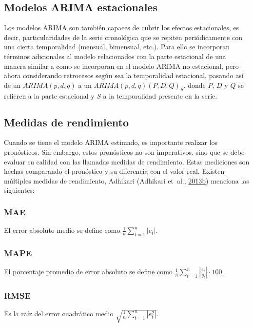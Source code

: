 \documentclass[]{article}
\begin{document}
\subsection{Modelos ARIMA estacionales}

Los modelos ARIMA son también capaces de cubrir los efectos
estacionales, es decir, particularidades de la serie cronológica que se
repiten periódicamente con una cierta temporalidad (mensual, bimensual,
etc.). Para ello se incorporan términos adicionales al modelo
relacionados con la parte estacional de una manera similar a como se
incorporan en el modelo ARIMA no estacional, pero ahora considerando
retrocesos según sea la temporalidad estacional, pasando así de un
\(ARIMA(p,d,q)\) a un \(ARIMA(p,d,q)(P,D,Q)_S\), donde \(P\), \(D\) y
\(Q\) se refieren a la parte estacional y \(S\) a la temporalidad
presente en la serie.

\subsection{Medidas de rendimiento}

Cuando se tiene el modelo ARIMA estimado, es importante realizar los
pronósticos. Sin embargo, estos pronósticos no son imperativos, sino que
se debe evaluar su calidad con las llamadas medidas de rendimiento.
Estas mediciones son hechas comparando el pronóstico y su diferencia con
el valor real. Existen múltiples medidas de rendimiento, Adhikari
(Adhikari et~al.,
\protect\hyperlink{ref-medidas}{2013}\protect\hyperlink{ref-medidas}{b})
menciona las siguientes:

\subsubsection{MAE}

El error absoluto medio se define como
\(\frac{1}{n}\sum_{t=1}^n |e_t|\).

\subsubsection{MAPE}

El porcentaje promedio de error absoluto se define como
\(\frac{1}{n}\sum_{t=1}^n \left|\frac{e_t}{y_t}\right|\cdot 100\).

\subsubsection{RMSE}

Es la raíz del error cuadrático medio
\(\sqrt{\frac{1}{n}\sum_{t=1}^n |e_t^2|}\).
\end{document}
